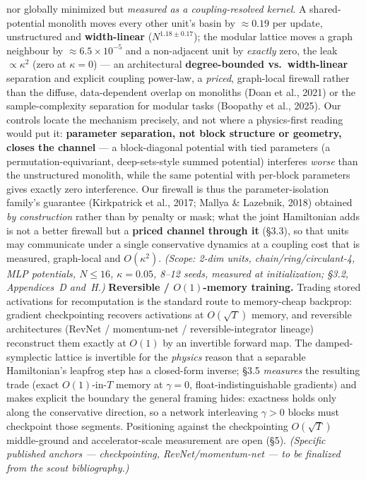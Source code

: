 \documentclass[11pt]{article}
\begin{document}
nor globally minimized but \emph{measured as a coupling-resolved kernel}. A shared-potential monolith moves every other unit's basin by $\approx0.19$ per update, unstructured and \textbf{width-linear} ($N^{1.18\pm0.17}$); the modular lattice moves a graph neighbour by $\approx6.5\times10^{-5}$ and a non-adjacent unit by \emph{exactly} zero, the leak $\propto\kappa^2$ (zero at $\kappa=0$) --- an architectural \textbf{degree-bounded vs.\ width-linear} separation and explicit coupling power-law, a \emph{priced}, graph-local firewall rather than the diffuse, data-dependent overlap on monoliths (Doan et al., 2021) or the sample-complexity separation for modular tasks (Boopathy et al., 2025). Our controls locate the mechanism precisely, and not where a physics-first reading would put it: \textbf{parameter separation, not block structure or geometry, closes the channel} --- a block-diagonal potential with tied parameters (a permutation-equivariant, deep-sets-style summed potential) interferes \emph{worse} than the unstructured monolith, while the same potential with per-block parameters gives exactly zero interference. Our firewall is thus the parameter-isolation family's guarantee (Kirkpatrick et al., 2017; Mallya \& Lazebnik, 2018) obtained \emph{by construction} rather than by penalty or mask; what the joint Hamiltonian adds is not a better firewall but a \textbf{priced channel through it} (\S3.3), so that units may communicate under a single conservative dynamics at a coupling cost that is measured, graph-local and $O(\kappa^2)$. \emph{(Scope: 2-dim units, chain/ring/circulant-4, MLP potentials, $N\le16$, $\kappa=0.05$, 8--12 seeds, measured at initialization; \S3.2, Appendices~D and~H.)} \textbf{Reversible / $O(1)$-memory training.} Trading stored activations for recomputation is the standard route to memory-cheap backprop: gradient checkpointing recovers activations at $O(\sqrt T)$ memory, and reversible architectures (RevNet / momentum-net / reversible-integrator lineage) reconstruct them exactly at $O(1)$ by an invertible forward map. The damped-symplectic lattice is invertible for the \emph{physics} reason that a separable Hamiltonian's leapfrog step has a closed-form inverse; \S3.5 \emph{measures} the resulting trade (exact $O(1)$-in-$T$ memory at $\gamma=0$, float-indistinguishable gradients) and makes explicit the boundary the general framing hides: exactness holds only along the conservative direction, so a network interleaving $\gamma>0$ blocks must checkpoint those segments. Positioning against the checkpointing $O(\sqrt T)$ middle-ground and accelerator-scale measurement are open (\S5). \emph{(Specific published anchors --- checkpointing, RevNet/momentum-net --- to be finalized from the scout bibliography.)}
\end{document}
